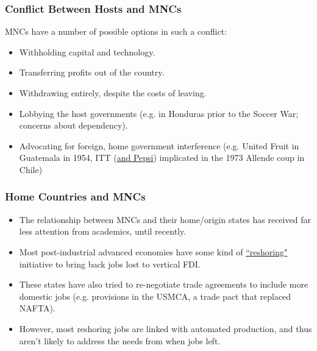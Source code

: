 \documentclass{beamer}
\begin{document}
\begin{frame} 
	\frametitle{\LARGE{Conflict Between Hosts and MNCs}}
	\begin{itemize}
		\large{
			\item MNCs have a number of possible options in such a conflict: \pause  
			\begin{itemize}
				\item Withholding capital and technology. \pause 
				\item Transferring profits out of the country. \pause 
				\item Withdrawing entirely, despite the costs of leaving. \pause 
				\item Lobbying the host governments (e.g. in Honduras prior to the Soccer War; concerns about dependency). \pause 
				\item Advocating for foreign, home government interference (e.g. United Fruit in Guatemala in 1954, ITT (\href{https://www.theguardian.com/business/1998/nov/08/observerbusiness.theobserver}{and Pepsi}) implicated in the 1973 Allende coup in Chile) 
			\end{itemize}
		}
	\end{itemize}
\end{frame}

\begin{frame} 
	\frametitle{\LARGE{Home Countries and MNCs}}
	\begin{itemize}
		\item The relationship between MNCs and their home/origin states has received far less attention from academics, until recently. \pause 
		\item Most post-industrial advanced economies have some kind of \href{https://www.jmfrri.gr.jp/english/430.html}{``reshoring"} initiative to bring back jobs lost to vertical FDI. \pause 
		\item These states have also tried to re-negotiate trade agreements to include more domestic jobs (e.g. provisions in the USMCA, a trade pact that replaced NAFTA). \pause 
		\item However, most reshoring jobs are linked with automated production, and thus aren't likely to address the needs from when jobs left.
	\end{itemize}
\end{frame}
\end{document}
